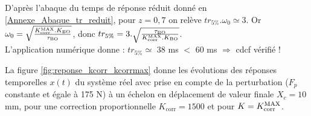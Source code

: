 \ifprof
\begin{corrige}
D'après l'abaque du temps de réponse réduit donné en \ref{Annexe_Abaque_tr_reduit}, pour $z = 0,7$ on relève $tr_{5\%}.\omega_0 \simeq 3$. Or $\omega_0 = \sqrt{\frac{K_{\text{corr}}^{\text{\text{MAX}}}.K_{\text{\text{BO}}}}{\tau_{\text{\text{BO}}}}} $, donc $tr_{5\%} = 3.\sqrt{\frac{\tau_{\text{\text{BO}}}}{K_{\text{corr}}^{\text{\text{MAX}}}.K_{\text{BO}}}}$. \\
L'application numérique donne : $tr_{5\%} \simeq $ 38 ms $<$ 60 ms $ \Rightarrow $ cdcf vérifié !
\end{corrige}
\fi


\ifprof
\else
La figure  \ref{fig:reponse_kcorr_kcorrmax} donne les évolutions des réponses temporelles $x(t)$ du système réel avec prise en compte de la perturbation ($F_p$ constante et égale à 175 N) à un échelon en déplacement de valeur finale $X_c = 10$ mm, pour une correction proportionnelle $K_{\text{corr}} = \num{1500}$ et pour $K = K_{\text{corr}}^{\text{\text{MAX}}}$.

